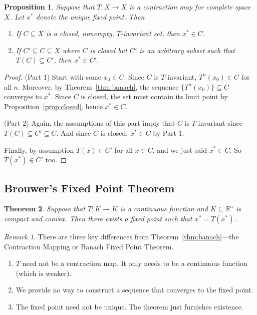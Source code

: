 \documentclass[12pt]{article}
\numberwithin{equation}{section} %
\theoremstyle{plain}
\newtheorem{thm}{Theorem}[section]
\newtheorem{prop}[thm]{Proposition}
\theoremstyle{definition}
\theoremstyle{remark}
\newtheorem*{rmk}{Remark}
\newcommand{\Rn}{\mathbb{R}^n}
\begin{document}
\begin{prop}
Suppose that $T: X\rightarrow X$ is a contraction map for complete space
$X$. Let $x^*$ denote the unique fixed point. Then
\begin{enumerate}
  \item If $C\subseteq X$ is a closed, nonempty, $T$-invariant set, then
    $x^* \in C$.
  \item If $C' \subseteq C \subseteq X$ where $C$ is closed but $C'$ is
    an arbitrary subset such that $T(C) \subseteq C'$, then $x^* \in
    C'$.
\end{enumerate}
\end{prop}
\begin{proof}
(Part 1) Start with some $x_0\in C$. Since $C$ is $T$-invariant,
$T^n(x_0) \in C$ for all $n$. Moreover, by Theorem~\ref{thm:banach},
the sequence $\{T^n(x_0)\}\subseteq C$ converges to $x^*$. Since $C$ is
closed, the set must contain its limit point by
Proposition~\ref{prop:closed}, hence $x^*\in C$.

(Part 2) Again, the assumptions of this part imply that $C$ is
$T$-invariant since $T(C)\subseteq C' \subseteq C$.  And since $C$ is
closed, $x^*\in C$ by Part 1.

Finally, by assumption $T(x) \in C'$ for all $x \in C$, and we just said
$x^*\in C$. So $T(x^*)\in C'$ too.
\end{proof}

\subsection{Brouwer's Fixed Point Theorem}

\begin{thm}
Suppose that $T:K\rightarrow K$ is a continuous function and $K\subseteq
\Rn$ is compact and convex.  Then there exists a fixed point
such that $x^*=T(x^*)$.
\end{thm}
\begin{rmk}
There are three key differences from Theorem~\ref{thm:banach}---the
Contraction Mapping or Banach Fixed Point Theorem.
\begin{enumerate}
  \item $T$ need not be a contraction map. It only needs to be a
    continuous function (which is weaker).
  \item We provide no way to construct a sequence that converges to the
    fixed point.
  \item The fixed point need not be unique. The theorem just furnishes
    existence.
\end{enumerate}
\end{rmk}
\end{document}
